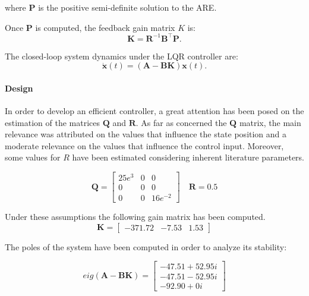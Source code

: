 where $\mathbf{P}$ is the positive semi-definite solution to the ARE.

Once $\mathbf{P}$ is computed, the feedback gain matrix $K$ is:
\begin{equation}
    \mathbf{K} = \mathbf{R}^{-1} \mathbf{B}^\top \mathbf{P}.
\end{equation}

The closed-loop system dynamics under the LQR controller are:
\begin{equation}
    \mathbf{\dot{x}}(t) = \mathbf{(A - B K)}\mathbf{x}(t).
\end{equation}

\paragraph{Design} In order to develop an efficient controller, a great attention has been posed on the estimation of the matrices $\mathbf{Q}$ and $\mathbf{R}$. As far as concerned the $\mathbf{Q}$ matrix, the main relevance was attributed on the values that influence the state position and a moderate relevance on the values that influence the control input. Moreover, some values for $R$ have been estimated considering inherent literature parameters.

\begin{equation}
    \mathbf{Q} =
    \begin{bmatrix}
        25e^3 & 0 & 0 \\ 0 & 0 & 0\\ 0 & 0 & 16e^{-2}
    \end{bmatrix}
    \quad
    \mathbf{R} = 0.5
\end{equation}

Under these assumptions the following gain matrix has been computed.
\begin{equation}
    \mathbf{K} =
    \begin{bmatrix}
        -371.72 & -7.53 & 1.53
    \end{bmatrix}
\end{equation}

The poles of the system have been computed in order to analyze its stability:

\begin{equation}
    eig\mathbf{(A-BK)} =
    \begin{bmatrix}
        -47.51 + 52.95i \\
        -47.51 - 52.95i \\
        -92.90 + 0i
    \end{bmatrix}
\end{equation}


